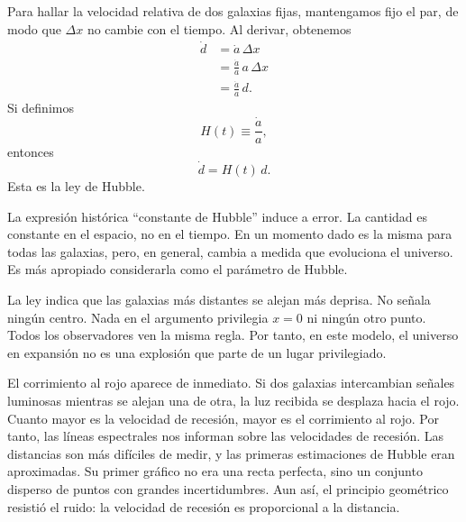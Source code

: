 Para hallar la velocidad relativa de dos galaxias fijas, mantengamos fijo el par, de modo que \(\Delta x\) no cambie con el tiempo. Al derivar, obtenemos
\begin{align}
\dot d &= \dot a\,\Delta x \\
       &= \frac{\dot a}{a}\,a\,\Delta x \\
       &= \frac{\dot a}{a}\,d.
\end{align}
Si definimos
\begin{equation}
H(t)\equiv \frac{\dot a}{a},
\end{equation}
entonces
\begin{equation}
\dot d = H(t)\,d.
\end{equation}
Esta es la ley de Hubble.

La expresión histórica ``constante de Hubble'' induce a error. La cantidad es constante en el espacio, no en el tiempo. En un momento dado es la misma para todas las galaxias, pero, en general, cambia a medida que evoluciona el universo. Es más apropiado considerarla como el parámetro de Hubble.

La ley indica que las galaxias más distantes se alejan más deprisa. No señala ningún centro. Nada en el argumento privilegia \(x=0\) ni ningún otro punto. Todos los observadores ven la misma regla. Por tanto, en este modelo, el universo en expansión no es una explosión que parte de un lugar privilegiado.

El corrimiento al rojo aparece de inmediato. Si dos galaxias intercambian señales luminosas mientras se alejan una de otra, la luz recibida se desplaza hacia el rojo. Cuanto mayor es la velocidad de recesión, mayor es el corrimiento al rojo. Por tanto, las líneas espectrales nos informan sobre las velocidades de recesión. Las distancias son más difíciles de medir, y las primeras estimaciones de Hubble eran aproximadas. Su primer gráfico no era una recta perfecta, sino un conjunto disperso de puntos con grandes incertidumbres. Aun así, el principio geométrico resistió el ruido: la velocidad de recesión es proporcional a la distancia.

\begin{classroomqa}\end{classroomqa}

